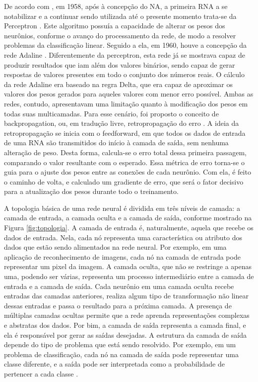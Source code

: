   De acordo com  \cite{rauber2005redes}, em 1958, após à concepção do NA, a primeira RNA a se notabilizar e a continuar sendo utilizada até o presente momento trata-se da Perceptron \cite{rosenblatt1958perceptron}. Este algoritmo possuía a capacidade de alterar os pesos dos neurônios, conforme o avanço do processamento da rede, de modo a resolver problemas da classificação linear. Seguido a ela, em 1960, houve a concepção da rede Adaline \cite{widrow1960adaptive}. Diferentemente da perceptron, esta rede já se mostrava capaz de produzir resultados que iam além dos valores binários, sendo capaz de gerar respostas de valores presentes em todo o conjunto dos números reais. O cálculo da rede Adaline era baseado na regra Delta, que era capaz de aproximar os valores dos pesos gerados para aqueles valores com menor erro possível. Ambas as redes, contudo, apresentavam uma limitação quanto à modificação dos pesos em todas suas multicamadas. Para esse cenário, foi proposto o conceito de backpropagation, ou, em tradução livre, retropropagação do erro \cite{rumelhart1986learning}. A ideia da retropropagação se inicia com o feedforward, em que todos os dados de entrada de uma RNA são transmitidos do início à camada de saída, sem nenhuma alteração de peso. Desta forma, calcula-se o erro total dessa primeira passagem, comparando o valor resultante com o esperado. Essa métrica de erro torna-se o guia para o ajuste dos pesos entre as conexões de cada neurônio. Com ela, é feito o caminho de volta, e calculado um gradiente de erro, que será o fator decisivo para a atualização dos pesos durante todo o treinamento.
  
  A topologia básica de uma rede neural é dividida em três níveis de camada: a camada de entrada, a camada oculta e a camada de saída, conforme mostrado na Figura \ref{fig:topologia}. A camada de entrada é, naturalmente, aquela que recebe os dados de entrada. Nela, cada nó representa uma característica ou atributo dos dados que estão sendo alimentados na rede neural. Por exemplo, em uma aplicação de reconhecimento de imagens, cada nó na camada de entrada pode representar um pixel da imagem. A camada oculta, que não se restringe a apenas uma, podendo ser várias, representa um processo intermediário entre a camada de entrada e a camada de saída. Cada neurônio em uma camada oculta recebe entradas das camadas anteriores, realiza algum tipo de transformação não linear dessas entradas e passa o resultado para a próxima camada. A presença de múltiplas camadas ocultas permite que a rede aprenda representações complexas e abstratas dos dados. Por bim, a camada de saída representa a camada final, e ela é responsável por gerar as saídas desejadas. A estrutura da camada de saída depende do tipo de problema que está sendo resolvido. Por exemplo, em um problema de classificação, cada nó na camada de saída pode representar uma classe diferente, e a saída pode ser interpretada como a probabilidade de pertencer a cada classe \cite{rauber2005redes}.
  
